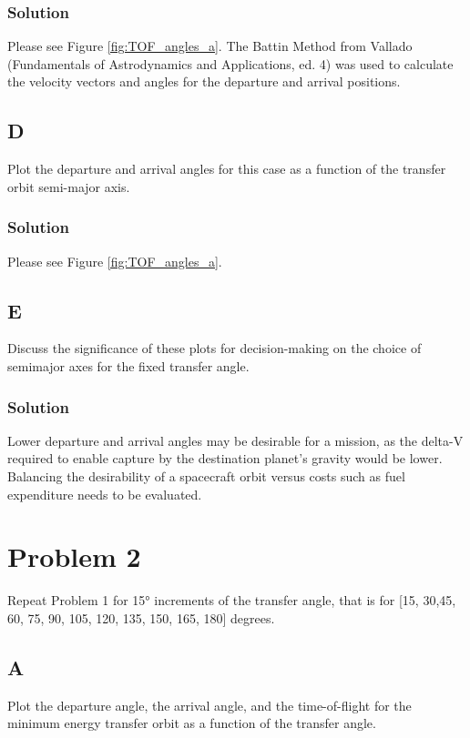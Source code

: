 \documentclass[conf]{new-aiaa}
\begin{document}
\subsubsection*{Solution}

Please see Figure \ref{fig:TOF_angles_a}. The Battin Method from Vallado (Fundamentals of Astrodynamics and Applications, ed. 4) was used to calculate the velocity vectors and angles for the departure and arrival positions. 

\subsection*{D}
Plot the departure and arrival angles for this case as a function of the transfer orbit
semi-major axis.

\subsubsection*{Solution}

Please see Figure \ref{fig:TOF_angles_a}. 

\subsection*{E}
Discuss the significance of these plots for decision-making on the choice of semimajor axes for the fixed transfer angle.

\subsubsection*{Solution}

Lower departure and arrival angles may be desirable for a mission, as the delta-V required to enable capture by the destination planet's gravity would be lower. Balancing the desirability of a spacecraft orbit versus costs such as fuel expenditure needs to be evaluated.  


\section*{Problem 2}

Repeat Problem 1 for 15° increments of the transfer angle, that is for [15, 30,45, 60, 75,
90, 105, 120, 135, 150, 165, 180] degrees.

\subsection*{A}
Plot the departure angle, the arrival angle, and the time-of-flight for the minimum
energy transfer orbit as a function of the transfer angle.
\end{document}

